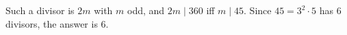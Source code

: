 Such a divisor is $2m$ with $m$ odd, and $2m\mid360$ iff $m\mid45$. Since $45=3^2\cdot5$ has $6$ divisors, the answer is $\boxed{6}$.
